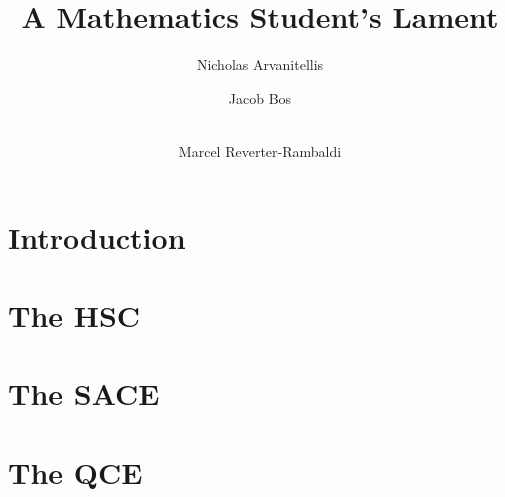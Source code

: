 \documentclass[11pt]{report}
\title{A Mathematics Student's Lament}
\author[1]{Nicholas Arvanitellis}
\author[2]{Jacob Bos}
\author[3]{\\Marcel Reverter-Rambaldi}
\affil[1,2,3]{Australian National University}
\affil[3]{The University of Queensland}
\begin{document}
    \maketitle
    \tableofcontents
\newpage
{}

\chapter{Introduction}




\chapter{The HSC}




\chapter{The SACE}


\chapter{The QCE}


\end{document}
